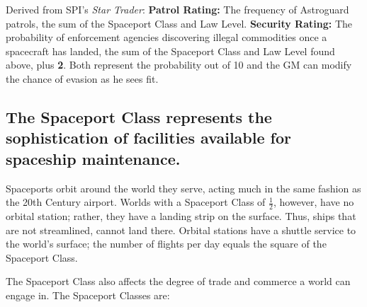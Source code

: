Derived from SPI's \emph{Star Trader}: \textbf{Patrol Rating:} The
frequency of Astroguard patrols, the sum of the Spaceport Class and
Law Level. \textbf{Security Rating:} The probability of enforcement
agencies discovering illegal commodities once a spacecraft has landed,
the sum of the Spaceport Class and Law Level found above, plus
\textbf{2}. Both represent the probability out of 10 and the GM can
modify the chance of evasion as he sees fit.

\subsection[Spaceport Class]{The Spaceport Class represents the
  sophistication of facilities available for spaceship maintenance.}
\label{sec:spaceport-class}

Spaceports orbit around the world they serve, acting much in the same
fashion as the 20th Century airport. Worlds with a Spaceport Class of
$\frac12$, however, have no orbital station; rather, they have a
landing strip on the surface. Thus, ships that are not streamlined,
cannot land there. Orbital stations have a shuttle service to the
world's surface; the number of flights per day equals the square of
the Spaceport Class.

The Spaceport Class also affects the degree of trade and commerce a
world can engage in. The Spaceport Classes are:

